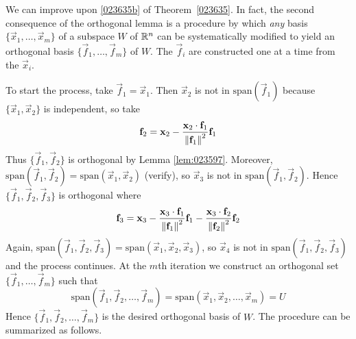 \documentclass{ximera}
\begin{document}
We can improve upon \ref{023635b} of Theorem~\ref{023635}. In fact, the second consequence of the orthogonal lemma is a procedure by which \textit{any} basis $\{\vec{x}_{1}, \dots , \vec{x}_{m}\}$ of a subspace $W$ of $\mathbb{R}^n$ can be systematically modified to yield an orthogonal basis $\{\vec{f}_{1}, \dots , \vec{f}_{m}\}$ of $W$. The $\vec{f}_{i}$ are constructed one at a time from the $\vec{x}_{i}$.

To start the process, take $\vec{f}_{1} = \vec{x}_{1}$. Then $\vec{x}_{2}$ is not in $\mbox{span}\left(\vec{f}_{1}\right)$ because $\{\vec{x}_{1}, \vec{x}_{2}\}$ is independent, so take
\begin{equation*}
\mathbf{f}_{2} = \mathbf{x}_{2} - \frac{\mathbf{x}_{2} \cdot \mathbf{f}_{1}}{\left\lVert\mathbf{f}_{1}\right\rVert^2}\mathbf{f}_{1}
\end{equation*}
Thus $\{\vec{f}_{1}, \vec{f}_{2}\}$ is orthogonal by Lemma \ref{lem:023597}. Moreover, $\mbox{span}\left(\vec{f}_{1}, \vec{f}_{2}\right) = \mbox{span}\left(\vec{x}_{1}, \vec{x}_{2}\right)$ (verify), so $\vec{x}_{3}$ is not in $\mbox{span}\left(\vec{f}_{1}, \vec{f}_{2}\right)$. Hence $\{\vec{f}_{1}, \vec{f}_{2}, \vec{f}_{3}\}$ is orthogonal where
\begin{equation*}
\mathbf{f}_{3} = \mathbf{x}_{3} - \frac{\mathbf{x}_{3} \cdot \mathbf{f}_{1}}{\left\lVert\mathbf{f}_{1}\right\rVert^2}\mathbf{f}_{1} - \frac{\mathbf{x}_{3} \cdot \mathbf{f}_{2}}{\left\lVert\mathbf{f}_{2}\right\rVert^2}\mathbf{f}_{2}
\end{equation*}
Again, $\mbox{span}\left(\vec{f}_{1}, \vec{f}_{2}, \vec{f}_{3}\right) = \mbox{span}\left(\vec{x}_{1}, \vec{x}_{2}, \vec{x}_{3}\right)$, so $\vec{x}_{4}$ is not in $\mbox{span}\left(\vec{f}_{1}, \vec{f}_{2}, \vec{f}_{3}\right)$ and the process continues. At the $m$th iteration we construct an orthogonal set $\{\vec{f}_{1}, \dots , \vec{f}_{m}\}$ such that
\begin{equation*}
\mbox{span}\left(\vec{f}_{1}, \vec{f}_{2}, \dots, \vec{f}_{m}\right) = \mbox{span}\left(\vec{x}_{1}, \vec{x}_{2}, \dots, \vec{x}_{m}\right) = U
\end{equation*}
Hence $\{\vec{f}_{1}, \vec{f}_{2}, \dots , \vec{f}_{m}\}$ is the desired orthogonal basis of $W$. The procedure can be summarized as follows.
\end{document}
